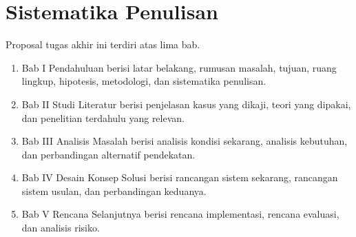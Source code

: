 \section{Sistematika Penulisan}
Proposal tugas akhir ini terdiri atas lima bab.
\begin{enumerate}
\item	Bab I Pendahuluan berisi latar belakang, rumusan masalah, tujuan, ruang lingkup, hipotesis, metodologi, dan sistematika penulisan.
\item	Bab II Studi Literatur berisi penjelasan kasus yang dikaji, teori yang dipakai, dan penelitian terdahulu yang relevan.
\item	Bab III Analisis Masalah berisi analisis kondisi sekarang, analisis kebutuhan, dan perbandingan alternatif pendekatan.
\item	Bab IV Desain Konsep Solusi berisi rancangan sistem sekarang, rancangan sistem usulan, dan perbandingan keduanya.
\item	Bab V Rencana Selanjutnya berisi rencana implementasi, rencana evaluasi, dan analisis risiko.
\end{enumerate}

